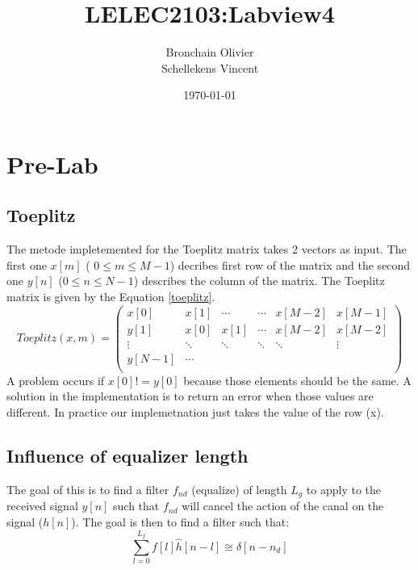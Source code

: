 \documentclass{article}
\title{LELEC2103:Labview4}
\author{Bronchain Olivier \\ Schellekens Vincent}
\date{\today}
\begin{document}
\maketitle

\section{Pre-Lab}
    \subsection{Toeplitz}
        The metode impletemented for the Toeplitz matrix takes 2 vectors as input. The first one $x[m]$ ( $0\le m \le M-1$) decribes first row of the matrix and the second one $y[n]$ ($0 \le n \le N-1$) describes the column of the matrix. The Toeplitz matrix is given by the Equation \ref{toeplitz}.
        \begin{equation}
            Toeplitz(x,m) =
                \begin{pmatrix} 
                    x[0] & x[1] & \cdots& \cdots & x[M-2] & x[M-1] \\
                    y[1] & x[0] & x[1] & \cdots & x[M-2] & x[M-2] \\
                    \vdots & \ddots & \ddots & \ddots & \ddots & \vdots \\
                    y[N-1] & \cdots &  & & & \\
                \end{pmatrix}
                \label{toeplitz}
        \end{equation}
        A problem occurs if $x[0]!=y[0]$ because those elements should be the same. A solution in the implementation is to return an error when those values are different. In practice our implemetnation just takes the value of the row (x).
        
    \subsection{Influence of equalizer length}
        The goal of this is to find a filter $f_{nd}$ (equalize) of length $L_g$ to apply to the received signal $y[n]$ such that $f_{nd}$ will cancel the action of the canal on the signal ($h[n]$). The goal is then to find a filter such that:
            \begin{equation}
                \sum_{l=0}^{L_f} f[l]\hat{h}[n-l] \cong \delta[n-n_d]
            \end{equation}  
            
\end{document}

